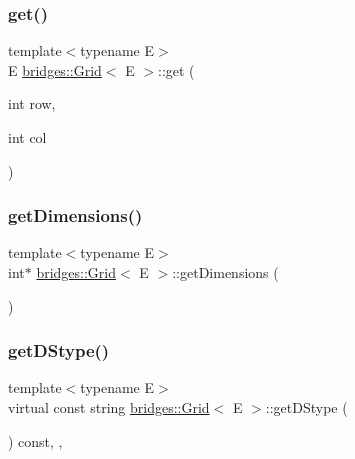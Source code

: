 \subsubsection{\texorpdfstring{get()}{get()}}
{\footnotesize\ttfamily template$<$typename E$>$ \\
E \mbox{\hyperlink{classbridges_1_1_grid}{bridges\+::\+Grid}}$<$ E $>$\+::get (\begin{DoxyParamCaption}\item[{int}]{row,  }\item[{int}]{col }\end{DoxyParamCaption})\hspace{0.3cm}{\ttfamily [inline]}}

\mbox{\label{classbridges_1_1_grid_ad21e4fc94483ef822fda9b74a52b9f48}} 
\subsubsection{\texorpdfstring{get\+Dimensions()}{getDimensions()}}
{\footnotesize\ttfamily template$<$typename E$>$ \\
int$\ast$ \mbox{\hyperlink{classbridges_1_1_grid}{bridges\+::\+Grid}}$<$ E $>$\+::get\+Dimensions (\begin{DoxyParamCaption}{ }\end{DoxyParamCaption})\hspace{0.3cm}{\ttfamily [inline]}}

\mbox{\label{classbridges_1_1_grid_ab701d081de4f7ffafb15966758dd5446}} 
\subsubsection{\texorpdfstring{get\+D\+Stype()}{getDStype()}}
{\footnotesize\ttfamily template$<$typename E$>$ \\
virtual const string \mbox{\hyperlink{classbridges_1_1_grid}{bridges\+::\+Grid}}$<$ E $>$\+::get\+D\+Stype (\begin{DoxyParamCaption}{ }\end{DoxyParamCaption}) const\hspace{0.3cm}{\ttfamily [inline]}, {\ttfamily [override]}, {\ttfamily [virtual]}}

